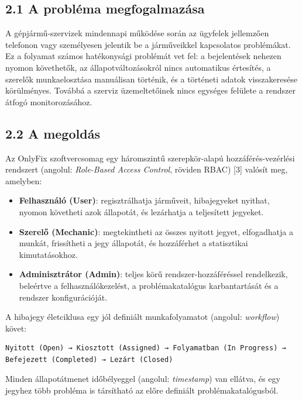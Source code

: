 \subsection{2.1 A probléma megfogalmazása}\label{a-probluxe9ma-megfogalmazuxe1sa}

A gépjármű-szervizek mindennapi működése során az ügyfelek jellemzően telefonon vagy személyesen jelentik be a járműveikkel kapcsolatos problémákat. Ez a folyamat számos hatékonysági problémát vet fel: a bejelentések nehezen nyomon követhetők, az állapotváltozásokról nincs automatikus értesítés, a szerelők munkaelosztása manuálisan történik, és a történeti adatok visszakeresése körülményes. Továbbá a szerviz üzemeltetőinek nincs egységes felülete a rendszer átfogó monitorozásához.

\subsection{2.2 A megoldás}\label{a-megolduxe1s}

Az OnlyFix szoftvercsomag egy háromszintű szerepkör-alapú hozzáférés-vezérlési rendszert (angolul: \emph{Role-Based Access Control}, röviden RBAC) {[}3{]} valósít meg, amelyben:

\begin{itemize}
\item
  \textbf{Felhasználó (User)}: regisztrálhatja járműveit, hibajegyeket nyithat, nyomon követheti azok állapotát, és lezárhatja a teljesített jegyeket.
\item
  \textbf{Szerelő (Mechanic)}: megtekintheti az összes nyitott jegyet, elfogadhatja a munkát, frissítheti a jegy állapotát, és hozzáférhet a statisztikai kimutatásokhoz.
\item
  \textbf{Adminisztrátor (Admin)}: teljes körű rendszer-hozzáféréssel rendelkezik, beleértve a felhasználókezelést, a problémakatalógus karbantartását és a rendszer konfigurációját.
\end{itemize}

A hibajegy életciklusa egy jól definiált munkafolyamatot (angolul: \emph{workflow}) követ:

\begin{verbatim}
Nyitott (Open) → Kiosztott (Assigned) → Folyamatban (In Progress) → Befejezett (Completed) → Lezárt (Closed)
\end{verbatim}

Minden állapotátmenet időbélyeggel (angolul: \emph{timestamp}) van ellátva, és egy jegyhez több probléma is társítható az előre definiált problémakatalógusból.

